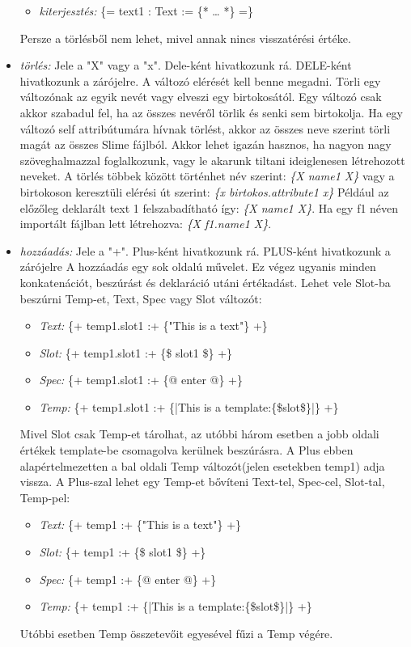 \begin{itemize}
\begin{itemize}
\item\emph{kiterjesztés:} \{= text1 : Text := \{* … *\} =\}
\end{itemize}
Persze a törlésből nem lehet, mivel annak nincs visszatérési értéke.
\item \emph{törlés:} 
Jele a "X" vagy a "x".
Dele-ként hivatkozunk rá.
DELE-ként hivatkozunk a zárójelre.
A változó elérését kell benne megadni.
Törli egy változónak az egyik nevét vagy elveszi egy birtokosától.
Egy változó csak akkor szabadul fel, ha az összes nevéről törlik és senki sem birtokolja.
Ha egy változó self attribútumára hívnak törlést, akkor az összes neve szerint törli magát az összes Slime fájlból.
Akkor lehet igazán hasznos, ha nagyon nagy szöveghalmazzal foglalkozunk, vagy le akarunk tiltani ideiglenesen létrehozott neveket.
A törlés többek között történhet név szerint: \textit{\{X name1 X\}} vagy a birtokoson keresztüli elérési út szerint: \textit{\{x birtokos.attribute1 x\}} 
Például az előzőleg deklarált text 1 felszabadítható így: \textit{\{X name1 X\}}.
Ha egy f1 néven importált fájlban lett létrehozva: \textit{\{X f1.name1 X\}}.
\item \emph{hozzáadás:}
Jele a "+".
Plus-ként hivatkozunk rá.
PLUS-ként hivatkozunk a zárójelre
A hozzáadás egy sok oldalú művelet. 
Ez végez ugyanis minden konkatenációt, beszúrást és deklaráció utáni értékadást.
Lehet vele Slot-ba beszúrni Temp-et, Text, Spec vagy Slot változót: 
\begin{itemize}
\item\emph{Text:} \{+ temp1.slot1 :+ \{"This is a text"\} +\}
\item\emph{Slot:} \{+ temp1.slot1 :+ \{\$ slot1 \$\} +\}
\item\emph{Spec:} \{+ temp1.slot1 :+ \{@ enter @\} +\}
\item\emph{Temp:} \{+ temp1.slot1 :+ \{|This is a template:\{\$slot\$\}|\} +\}
\end{itemize}
Mivel Slot csak Temp-et tárolhat, az utóbbi három esetben a jobb oldali értékek template-be csomagolva kerülnek beszúrásra. 
A Plus ebben alapértelmezetten a bal oldali Temp változót(jelen esetekben temp1) adja vissza.
A Plus-szal lehet egy Temp-et bővíteni Text-tel, Spec-cel, Slot-tal, Temp-pel:
\begin{itemize}
\item\emph{Text:} \{+ temp1 :+ \{"This is a text"\} +\}
\item\emph{Slot:} \{+ temp1 :+ \{\$ slot1 \$\} +\}
\item\emph{Spec:} \{+ temp1 :+ \{@ enter @\} +\}
\item\emph{Temp:} \{+ temp1 :+ \{|This is a template:\{\$slot\$\}|\} +\}
\end{itemize} 
Utóbbi esetben Temp összetevőit egyesével fűzi a Temp végére. 


\end{itemize}
